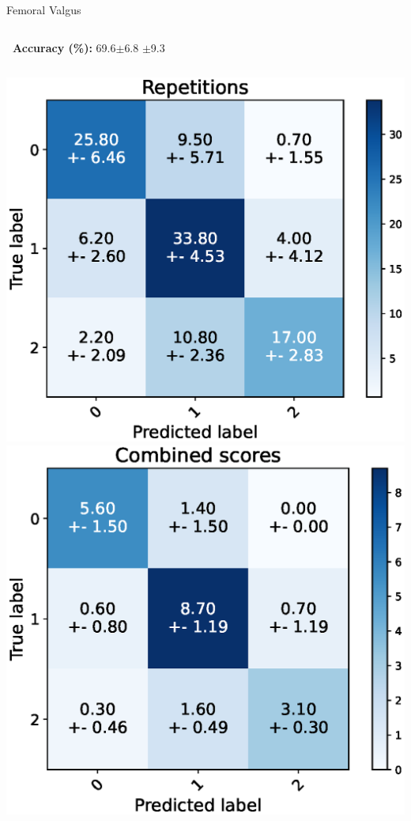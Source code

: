 \begin{frame}[fragile]{Femoral Valgus}
  \begin{columns}
    \textbf{\small~Accuracy (\%):} 69.6$\pm$6.8
    \vspace{0.3cm}
    $\pm$9.3
    \vspace{0.3cm}
  \end{columns}
  \begin{columns}
    \centering
    \includegraphics[width=\textwidth]{files/figs/res/femval/cnf-reps.eps}
    \centering
    \includegraphics[width=\textwidth]{files/figs/res/femval/cnf-combined.eps}

\end{columns}
\end{frame}
